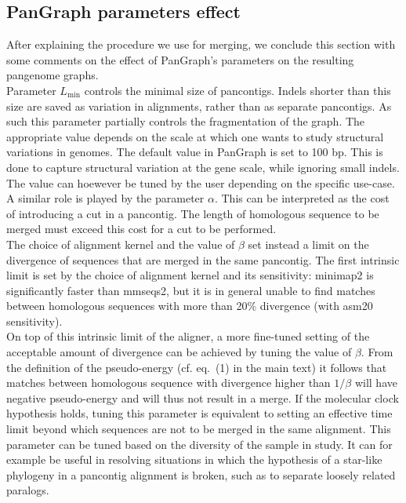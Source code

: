 \documentclass[aps,rmp,reprint,superscriptaddress,notitlepage,10pt,onecolumn]{revtex4-1}
\newcommand{\Lthr}{L_{\min}}
\begin{document}


\subsection{PanGraph parameters effect}

After explaining the procedure we use for merging, we conclude this section with some comments on the effect of PanGraph's parameters on the resulting pangenome graphs.\\

Parameter $\Lthr$ controls the minimal size of pancontigs. Indels shorter than this size are saved as variation in alignments, rather than as separate pancontigs. As such this parameter partially controls the fragmentation of the graph. The appropriate value depends on the scale at which one wants to study structural variations in genomes. The default value in PanGraph is set to 100 bp. This is done to capture structural variation at the gene scale, while ignoring small indels. The value can hoewever be tuned by the user depending on the specific use-case.\\
A similar role is played by the parameter $\alpha$. This can be interpreted as the cost of introducing a cut in a pancontig. The length of homologous sequence to be merged must exceed this cost for a cut to be performed.\\

The choice of alignment kernel and the value of $\beta$ set instead a limit on the divergence of sequences that are merged in the same pancontig. The first intrinsic limit is set by the choice of alignment kernel and its sensitivity: minimap2 is significantly faster than mmseqs2, but it is in general unable to find matches between homologous sequences with more than 20\% divergence (with asm20 sensitivity).\\
On top of this intrinsic limit of the aligner, a more fine-tuned setting of the acceptable amount of divergence can be achieved by tuning the value of $\beta$. From the definition of the pseudo-energy (cf. eq.~(1) in the main text) it follows that matches between homologous sequence with divergence higher than $1/\beta$ will have negative pseudo-energy and will thus not result in a merge. If the molecular clock hypothesis holds, tuning this parameter is equivalent to setting an effective time limit beyond which sequences are not to be merged in the same alignment. This parameter can be tuned based on the diversity of the sample in study. It can for example be useful in resolving situations in which the hypothesis of a star-like phylogeny in a pancontig alignment is broken, such as to separate loosely related paralogs.
\end{document}
